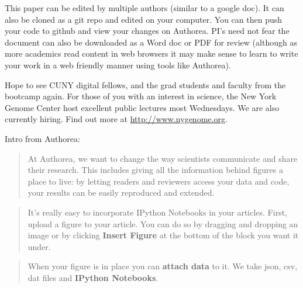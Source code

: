 This paper can be edited by multiple authors (similar to a google doc). It can also be cloned as a git repo and edited on your computer. You can then push your code to github and view your changes on Authorea. PI's need not fear the document can also be downloaded as a Word doc or PDF for review (although as more academics read content in web browsers it may make sense to learn to write your work in a web friendly manner using tools like Authorea).

Hope to see CUNY digital fellows, and the grad students and faculty from the bootcamp again. For those of you with an interest in science, the New York Genome Center host excellent public lectures most Wednesdays. We are also currently hiring. Find out more at \href{http://}{http://www.nygenome.org}.

Intro from Authorea: 
\begin{quote}
At Authorea, we want to change the way scientists communicate and share their research. This includes giving all the information behind figures a place to live: by letting readers and reviewers access your data and code, your results can be easily reproduced and extended.
\end{quote}

\begin{quote}
It's really easy to incorporate IPython Notebooks in your articles.  First, upload a figure to your article. You can do so by dragging and dropping an image or by clicking \textbf{Insert Figure} at the bottom of the block you want it under.  
\end{quote}

\begin{quote}
When your figure is in place you can \textbf{attach data} to it. We take json, csv, dat files and \textbf{IPython Notebooks}. 
\end{quote}